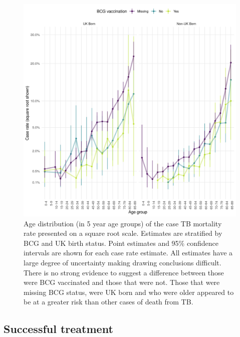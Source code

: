 \documentclass[11pt,twoside]{bristolthesis}
\begin{document}
  \begin{figure}
  
  {\centering \includegraphics[width=0.8\linewidth]{chapters/tb-epi-england/figures/plot-tb-mort-age-dist} 
  
  }
  
  \caption{Age distribution (in 5 year age groups) of the case TB mortality rate presented on a square root scale. Estimates are stratified by BCG and UK birth status. Point estimates and 95\%  confidence intervals are shown for each case rate estimate. All estimates have a large degree of uncertainty making drawing conclusions difficult. There is no strong evidence to suggest a difference between those were BCG vaccinated and those that were not. Those that were missing BCG status, were UK born and who were older appeared to be at a greater risk than other cases of death from TB.}\label{fig:plot-tb-mort-age-dist}
  \end{figure}
  \hypertarget{successful-treatment}{%
  \subsection{Successful treatment}\label{successful-treatment}}
  
\end{document}
